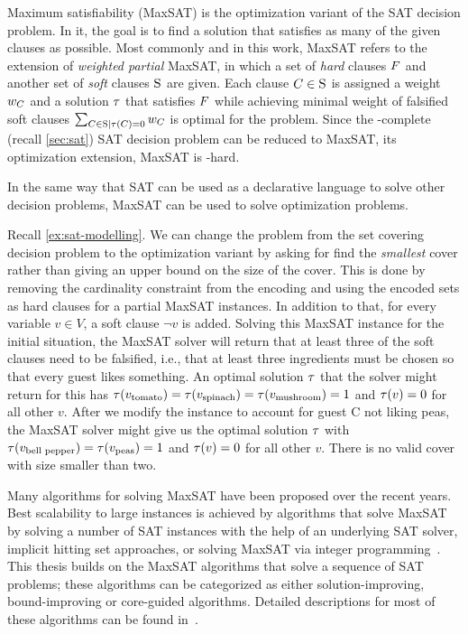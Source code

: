 Maximum satisfiability (MaxSAT) is the optimization variant of the SAT decision problem.
In it, the goal is to find a solution that satisfies as many of the given clauses as possible.
Most commonly and in this work, MaxSAT refers to the extension of \emph{weighted partial} MaxSAT, in which a set of \emph{hard} clauses $F$ and another set of \emph{soft} clauses $\textsc{S}$ are given.
Each clause $C \in \textsc{S}$ is assigned a weight $w_C$ and a solution $\tau$ that satisfies $F$ while achieving minimal weight of falsified soft clauses $\sum_{C\in\textsc{S} \mid \tau(C)=0} w_C$ is optimal for the problem.
Since the \NP-complete (recall \cref{sec:sat}) SAT decision problem can be reduced to MaxSAT, its optimization extension, MaxSAT is \NP-hard.

In the same way that SAT can be used as a declarative language to solve other decision problems, MaxSAT can be used to solve optimization problems.

\begin{example}\label{ex:maxsat-modelling}
  Recall \cref{ex:sat-modelling}.
  We can change the problem from the set covering decision problem to the optimization variant by asking for find the \emph{smallest} cover rather than giving an upper bound on the size of the cover.
  This is done by removing the cardinality constraint from the encoding and using the encoded sets as hard clauses for a partial MaxSAT instances.
  In addition to that, for every variable $v\in V$, a soft clause $\lnot v$ is added.
  Solving this MaxSAT instance for the initial situation, the MaxSAT solver will return that at least three of the soft clauses need to be falsified, i.e., that at least three ingredients must be chosen so that every guest likes something.
  An optimal solution $\tau$ that the solver might return for this has $\tau(v_\text{tomato}) = \tau(v_\text{spinach}) = \tau(v_\text{mushroom}) = 1$ and $\tau(v) = 0$ for all other $v$.
  After we modify the instance to account for guest C not liking peas, the MaxSAT solver might give us the optimal solution $\tau$ with $\tau(v_\text{bell pepper}) = \tau(v_\text{peas}) = 1$ and $\tau(v) = 0$ for all other $v$.
  There is no valid cover with size smaller than two.
\end{example}

Many algorithms for solving MaxSAT have been proposed over the recent years.
Best scalability to large instances is achieved by algorithms that solve MaxSAT by solving a number of SAT instances with the help of an underlying SAT solver, implicit hitting set approaches, or solving MaxSAT via integer programming~\autocite{handbook2-maxsat}.
This thesis builds on the MaxSAT algorithms that solve a sequence of SAT problems;
these algorithms can be categorized as either solution-improving, bound-improving or core-guided algorithms.
Detailed descriptions for most of these algorithms can be found in~\autocite{handbook2-maxsat}.

